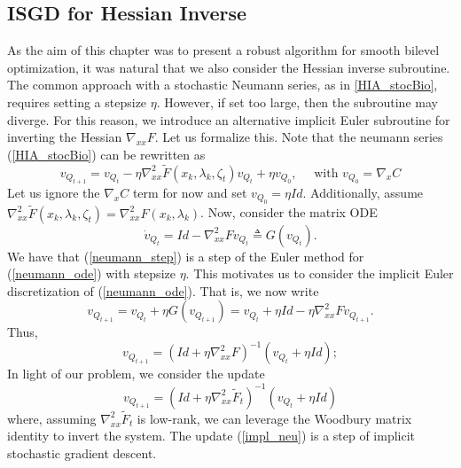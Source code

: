 \documentclass[11pt, twoside]{report}
\begin{document}
\subsection{ISGD for Hessian Inverse}
As the aim of this chapter was to present a robust algorithm for smooth bilevel optimization, it was natural that we also consider the Hessian inverse subroutine. The common approach with a stochastic Neumann series, as in \ref{HIA_stocBio}, requires setting a stepsize $\eta$. However, if set too large, then the subroutine may diverge. For this reason, we introduce an alternative implicit Euler subroutine for inverting the Hessian $\nabla_{xx} F$. Let us formalize this. Note that the neumann series (\ref{HIA_stocBio}) can be rewritten as 
\begin{equation} \label{neumann_step}
    v_{Q_{t+1}} = v_{Q_{t}} - \eta \nabla_{xx}^2 \tilde{F}(x_k,\lambda_k,\zeta_t) v_{Q_{t}} + \eta v_{Q_0}, \quad \text{ with } v_{Q_0} = \nabla_x C
\end{equation}
Let us ignore the $\nabla_x C$ term for now and set $v_{Q_0} = \eta Id$. Additionally, assume $\nabla_{xx}^2 \tilde{F}(x_k,\lambda_k,\zeta_t) = \nabla_{xx}^2 F(x_k,\lambda_k)$. Now, consider the matrix ODE
\begin{equation} \label{neumann_ode}
    \dot{v}_{Q_{t}} = Id - \nabla_{xx}^2 F v_{Q_{t}} \triangleq G(v_{Q_{t}}).
\end{equation}
We have that (\ref{neumann_step}) is a step of the Euler method for (\ref{neumann_ode}) with stepsize $\eta$. This motivates us to consider the implicit Euler discretization of (\ref{neumann_ode}). That is, we now write
\[v_{Q_{t+1}} = v_{Q_{t}} + \eta G(v_{Q_{t+1}}) = v_{Q_{t}} + \eta Id - \eta \nabla_{xx}^2 F v_{Q_{t+1}}.\]
Thus,
\[v_{Q_{t+1}} = (Id + \eta \nabla_{xx}^2 F)^{-1}(v_{Q_{t}} + \eta Id);\]
In light of our problem, we consider the update
\begin{equation} \label{impl_neu}
    v_{Q_{t+1}} = (Id + \eta \nabla_{xx}^2 \tilde{F}_t)^{-1}(v_{Q_{t}} + \eta Id)
\end{equation}
where, assuming $\nabla_{xx}^2 \tilde{F}_t$ is low-rank, we can leverage the Woodbury matrix identity to invert the system. The update (\ref{impl_neu}) is a step of implicit stochastic gradient descent. 
\end{document}
